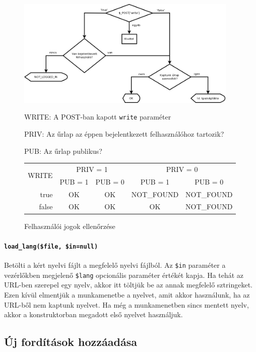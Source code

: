 \documentclass[12pt,a4paper,twoside]{article}
\newcommand{\desc}{
  \begin{description}{}{}
    \setlength\itemsep{0pt}
    \setlength\parskip{0pt}
    \setlength\topsep{0pt}
    \setlength\partopsep{0pt}
    \small}
\newcommand{\ed}{
  \end{description}
  \normalsize }
\begin{document}
\begin{figure}[h]
  \centering
  \includegraphics[width=400px]{rights.png}

  \desc\small
    \item[WRITE:] A POST-ban kapott \texttt{write} paraméter
    \item[PRIV:] Az űrlap az éppen bejelentkezett felhasználóhoz tartozik?
    \item[PUB:] Az űrlap publikus?
  \ed\normalsize

  \begin{tabular*}{\textwidth}{r|cc|cc}
    \multirow{2}{*}{WRITE} & \multicolumn{2}{c|}{PRIV = 1} & \multicolumn{2}{c}{PRIV = 0} \\
    & PUB = 1 & PUB = 0 & PUB = 1 & PUB = 0 \\
    \hline
    true  & OK & OK & NOT\_FOUND & NOT\_FOUND \\
    false & OK & OK & OK         & NOT\_FOUND \\
  \end{tabular*}

  \caption{Felhasználói jogok ellenőrzése}\label{fig:rights}
\end{figure}


\paragraph{\texttt{load\_lang(\$file, \$in=null)}}
Betölti a kért nyelvi fájlt a megfelelő nyelvi fájlból. Az \texttt{\$in}
paraméter a vezérlőkben megjelenő \texttt{\$lang} opcionális paraméter értékét
kapja. Ha tehát az URL-ben szerepel egy nyelv, akkor itt töltjük be az annak
megfelelő sztringeket. Ezen kívül elmentjük a munkamenetbe a nyelvet, amit akkor
használunk, ha az URL-ből nem kaptunk nyelvet. Ha még a munkamenetben sincs
mentett nyelv, akkor a konstruktorban megadott első nyelvet használjuk.


\subsection{Új fordítások hozzáadása}
\end{document}
